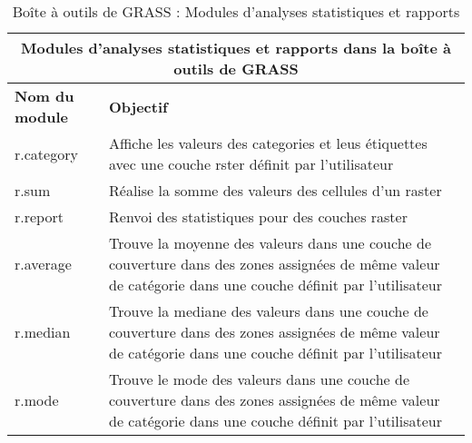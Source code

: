 \begin{table}[ht]
\centering
\caption{Bo\^ite \`a outils de GRASS : Modules d'analyses statistiques et rapports}\medskip
 \begin{tabular}{|p{4cm}|p{12cm}|}
  \hline \multicolumn{2}{|c|}{\textbf{Modules d'analyses statistiques et rapports dans la bo\^ite \`a outils de GRASS}} \\
  \hline \textbf{Nom du module} & \textbf{Objectif} \\
  \hline r.category & Affiche les valeurs des categories et leus \'etiquettes avec une couche rster d\'efinit par l'utilisateur \\
  \hline r.sum & R\'ealise la somme des valeurs des cellules d'un raster \\
  \hline r.report & Renvoi des statistiques pour des couches raster \\
  \hline r.average & Trouve la moyenne des valeurs dans une couche de couverture dans des zones assign\'ees de m\^eme valeur de cat\'egorie dans une couche d\'efinit par l'utilisateur \\
  \hline r.median & Trouve la mediane des valeurs dans une couche de couverture dans des zones assign\'ees de m\^eme valeur de cat\'egorie dans une couche d\'efinit par l'utilisateur \\
  \hline r.mode & Trouve le mode des valeurs dans une couche de couverture dans des zones assign\'ees de m\^eme valeur de cat\'egorie  dans une couche d\'efinit par l'utilisateur \\

\end{tabular}
\end{table}
